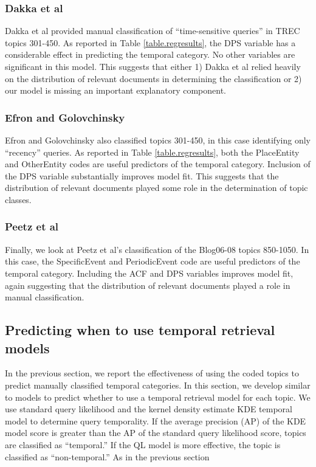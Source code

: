 \documentclass[runningheads,a4paper]{llncs}
\begin{document}
\subsubsection{Dakka et al}

Dakka et al provided manual classification of ``time-sensitive queries'' in TREC topics 301-450. As reported in Table \ref{table.regresults}, the DPS variable has a considerable effect in predicting the temporal category. No other variables are significant in this model. This suggests that either 1) Dakka et al relied heavily on the distribution of relevant documents in determining the classification or 2) our model is missing an important explanatory component.

\subsubsection{Efron and Golovchinsky}

Efron and Golovchinsky also classified topics 301-450, in this case identifying only ``recency'' queries. As reported in Table \ref{table.regresults}, both the PlaceEntity and OtherEntity codes are useful predictors of the temporal category. Inclusion of the DPS variable substantially improves model fit. This suggests that the distribution of relevant documents played some role in the determination of topic classes.

\subsubsection{Peetz et al}
Finally, we look at Peetz et al's classification of the Blog06-08 topics 850-1050. In this case, the SpecificEvent and PeriodicEvent code are useful predictors of the temporal category. Including the ACF and DPS variables improves model fit, again suggesting that the distribution of relevant documents played a role in manual classification.

\subsection{Predicting when to use temporal retrieval models}

In the previous section, we report the effectiveness of using the coded topics to predict manually classified temporal categories. In this section, we develop similar to models to predict whether to use a temporal retrieval model for each topic. We use standard query likelihood \cite{XXX} and the kernel density estimate {KDE} temporal model \cite{Efron2014} to determine query temporality. If the average precision (AP) of the KDE model score is greater than the AP of the standard query likelihood score, topics are classified as ``temporal.''  If the QL model is more effective, the topic is classified as ``non-temporal.'' As in the previous section
\end{document}
